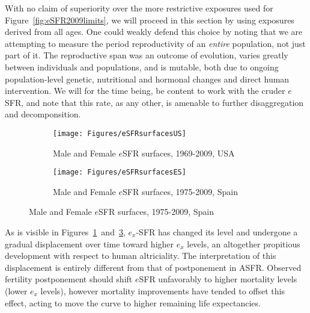 With no claim of superiority over the more
restrictive exposures used for Figure~\ref{fig:eSFR2009limits}, we will proceed
in this section by using exposures derived from all ages. One could weakly
defend this choice by noting that we are attempting to measure the period
reproductivity of an \textit{entire} population, not just part of it. The
reproductive span was an outcome of evolution, varies greatly between
individuals and populations, and is mutable, both due to ongoing
population-level genetic, nutritional and hormonal changes and direct human
intervention. We will for the time being, be content to work with the cruder $e$SFR, and note
that this rate, as any other, is amenable to further disaggregation and
decomponsition.

\begin{figure}
        \centering
        \begin{subfigure}
                \centering
                \caption{Male and Female $e$SFR surfaces, 1969-2009, USA}
                \texttt{[image: Figures/eSFRsurfacesUS]}
                \label{fig:exSFRsurfUS}
        \end{subfigure}
        \begin{subfigure}
                \centering
                \caption{Male and Female $e$SFR surfaces, 1975-2009, Spain}
                \texttt{[image: Figures/eSFRsurfacesES]} 
                \label{fig:exSFRsurfES}
        \end{subfigure}
\end{figure}

As is visible in Figures~\ref{fig:exSFRsurfUS}~and~\ref{fig:exSFRsurfES}, 
$e_x$-SFR has changed its level and undergone a gradual displacement over 
time toward higher $e_x$ levels, an altogether propitious development
with respect to human altriciality. The interpretation of this displacement is
entirely different from that of postponement in ASFR. Observed fertility 
postponement should shift $e$SFR unfavorably to higher mortality 
levels (lower $e_x$ levels), however mortality improvements have tended to 
offset this effect, acting to move the curve to higher
remaining life expectancies. 
